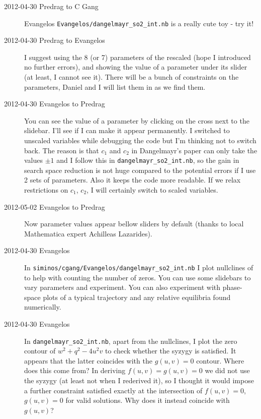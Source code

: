 \begin{description}
\item[2012-04-30 Predrag to C Gang] Evangelos
\texttt{Evangelos/dangelmayr\_so2\_int.nb} is a really cute toy - try it!

\item[2012-04-30 Predrag to Evangelos] I suggest using the 8 (or 7)
parameters of the rescaled  (hope I introduced no
further errors), and showing the value of a parameter under its slider
(at least, I cannot see it). There will be a bunch of constraints on the
parameters, Daniel and I will list them in as we find them.

\item[2012-04-30 Evangelos to Predrag] You can see the value of a parameter by
clicking on the cross next to the slidebar. I'll see if I can make it appear
permanently. I switched to unscaled variables while debugging the code but
I'm thinking not to switch back. The reason is that $c_1$ and $c_2$ in
Dangelmayr's paper can only take the values $\pm1$ and I follow this in
\texttt{dangelmayr\_so2\_int.nb}, so the gain in search space reduction is
not huge compared to the potential errors if I use 2 sets of parameters.
Also it keeps the code more readable. If we relax
restrictions on $c_1$, $c_2$, I will certainly switch to scaled variables.

\item[2012-05-02 Evangelos to Predrag] Now parameter values appear  bellow
sliders by default (thanks to local Mathematica expert Achilleas Lazarides).

\item[2012-04-30 Evangelos] In \texttt{siminos/cgang/Evangelos/dangelmayr\_so2\_int.nb}
I plot nullclines of  to help with counting the number of
zeros. You can use some slidebars to vary parameters and experiment. You can
also experiment with phase-space plots of a typical trajectory and any relative
equilibria found numerically.

\item[2012-04-30 Evangelos] In \texttt{dangelmayr\_so2\_int.nb}, apart from
the nullclines, I plot the zero contour of $w^2+q^2-4u^2v$ to check whether
the syzygy is satisfied. It appears that the latter coincides with the $g(u,v)=0$
contour. Where does this come from? In deriving $f(u,v)=g(u,v)=0$ we did not
use the syzygy (at least not when I rederived it), so I thought it would impose
a further constraint satisfied exactly at the intersection of $f(u,v)=0$,
$g(u,v)=0$ for valid solutions. Why does it instead coincide with $g(u,v)$?


\end{description}

